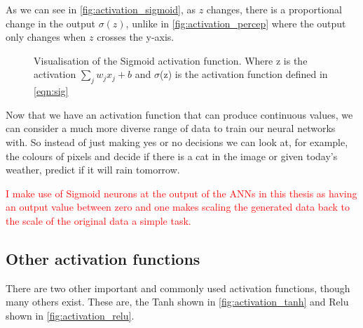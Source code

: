 As we can see in \autoref{fig:activation_sigmoid}, as $z$ changes, there is a proportional change in the output $\sigma(z)$, unlike in \autoref{fig:activation_percep} where the output only changes when $z$ crosses the y-axis.

\begin{figure}
\begin{center}
\caption{Visualisation of the Sigmoid activation function. Where z is the activation $\sum_{j} w_j x_j + b$ and $\sigma$(z) is the activation function defined in \autoref{eqn:sig} }
\label{fig:activation_sigmoid}
\end{center}
\end{figure}

Now that we have an activation function that can produce continuous values, we can consider a much more diverse range of data to train our neural networks with. So instead of just making yes or no decisions we can look at, for example, the colours of pixels and decide if there is a cat in the image or given today's weather, predict if it will rain tomorrow.

\textcolor{red}{I make use of Sigmoid neurons at the output of the \acp{ANN} in this thesis as having an output value between zero and one makes scaling the generated data back to the scale of the original data a simple task.}

\subsection{Other activation functions}
There are two other important and commonly used activation functions, though many others exist. These are, the \ac{Tanh} shown in \autoref{fig:activation_tanh} and \ac{Relu} shown in \autoref{fig:activation_relu}.

